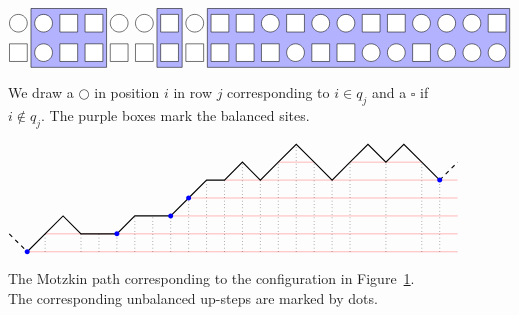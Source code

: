 \documentclass[reqno]{amsart}
\newcommand{\0}{\phantom{c}}
\theoremstyle{plain}
\theoremstyle{definition}
\numberwithin{equation}{section}
\begin{document}
\begin{figure}[t]
\[
\begin{tikzpicture}[scale=0.75]
  \def\sc{0.85}   %
  \def\ll{2}   %
  \def\l{1}   %
  \draw[fill=blue!30] (1.5*\sc,\l-.5) rectangle(4.5*\sc,\ll+.5);
  \draw[fill=blue!30] (6.5*\sc,\l-.5) rectangle(7.5*\sc,\ll+.5);
  \draw[fill=blue!30] (8.5*\sc,\l-.5) rectangle(20.5*\sc,\ll+.5);
  \foreach \i in {1,2,5,6,8,11,13,14,17,18,19} { \draw[fill=white] (\i*\sc,\ll) circle (0.3); }
  \foreach \i in {3,4,7,9,10,12,15,16,20} { \draw[fill=white] (\i*\sc-.3,\ll-.3) rectangle +(0.6,+0.6); }
  \foreach \i in {2,12,15,16,18,19,20} { \draw[fill=white] (\i*\sc,\l) circle (0.3); }
  \foreach \i in {1,3,4,5,6,7,8,9,10,11,13,14,17} { \draw[fill=white] (\i*\sc-.3,\l-.3) rectangle +(0.6,+0.6); }
\end{tikzpicture}
\]
\caption{We draw a $\bigcirc$ in position $i$ in row $j$ corresponding to $i \in q_j$ and a $\square$ if $i \notin q_j$.
The purple boxes mark the balanced sites.}
\label{fig:balanced}
\end{figure}

\begin{figure}[t]
\[
\begin{tikzpicture}[scale=0.45]
\draw[-,thin,red!50] (0,0) -- (24,0);
\draw[-,thin,red!50] (1,1) -- (24,1);
\draw[-,thin,red!50] (8,2) -- (24,2);
\draw[-,thin,red!50] (9,3) -- (24,3);
\draw[-,thin,red!50] (11,4) -- (24,4);
\draw[-,thin,red!50] (14,5) -- (16,5);
\draw[-,thin,red!50] (18,5) -- (22,5);
\draw[-,thick,dashed] (-1,1) -- (0,0);
\draw[-,dotted] (1,0) -- (1,1);
\draw[-,dotted] (3,0) -- (3,1);
\draw[-,dotted] (4,0) -- (4,1);
\draw[-,dotted] (5,0) -- (5,1);
\draw[-,dotted] (6,0) -- (6,2);
\draw[-,dotted] (7,0) -- (7,2);
\draw[-,dotted] (8,0) -- (8,2);
\draw[-,dotted] (9,0) -- (9,3);
\draw[-,dotted] (10,0) -- (10,4);
\draw[-,dotted] (11,0) -- (11,4);
\draw[-,dotted] (12,0) -- (12,5);
\draw[-,dotted] (13,0) -- (13,4);
\draw[-,dotted] (14,0) -- (14,5);
\draw[-,dotted] (15,0) -- (15,6);
\draw[-,dotted] (16,0) -- (16,5);
\draw[-,dotted] (17,0) -- (17,4);
\draw[-,dotted] (18,0) -- (18,5);
\draw[-,dotted] (20,0) -- (20,5);
\draw[-,dotted] (22,0) -- (22,5);
\draw[-,dotted] (23,0) -- (23,4);
\draw[-,thick] (0,0) -- (1,1) -- (2,2) -- (3,1) -- (4,1) -- (5,1) -- (6,2) -- (7,2) -- (8,2) -- (9,3) -- (10,4) -- (11,4) -- (12,5) -- (13,4) -- (14,5) -- (15,6) -- (16,5) -- (17,4) -- (18,5) -- (19,6) -- (20,5) -- (21,6) -- (22,5) -- (23,4);
\draw[-,thick,dashed] (23,4) -- (24,5);
\fill[blue] (0,0) circle (4pt);
\fill[blue] (5,1) circle (4pt);
\fill[blue] (8,2) circle (4pt);
\fill[blue] (9,3) circle (4pt);
\fill[blue] (23,4) circle (4pt);
\end{tikzpicture}
\]
\caption{The Motzkin path corresponding to the configuration in Figure~\ref{fig:balanced}.
The corresponding unbalanced up-steps are marked by dots.}
\label{fig:balanced_motzkin}
\end{figure}
\end{document}
